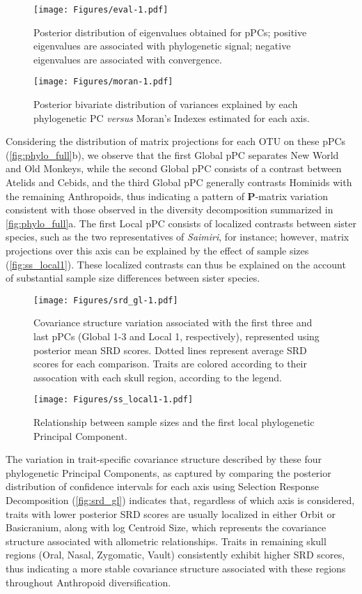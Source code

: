 \documentclass[12pt,twoside]{report}
\begin{document}
\begin{figure}[htbp]
\centering
\texttt{[image: Figures/eval-1.pdf]}
\caption{Posterior distribution of eigenvalues obtained for pPCs;
positive eigenvalues are associated with phylogenetic signal; negative
eigenvalues are associated with convergence. \label{fig:eval}}
\end{figure}

\begin{figure}[htbp]
\centering
\texttt{[image: Figures/moran-1.pdf]}
\caption{Posterior bivariate distribution of variances explained by each
phylogenetic PC \emph{versus} Moran's Indexes estimated for each axis.
\label{fig:moran}}
\end{figure}

Considering the distribution of matrix projections for each OTU on these
pPCs (\autoref{fig:phylo_full}b), we observe that the first Global pPC
separates New World and Old Monkeys, while the second Global pPC
consists of a contrast between Atelids and Cebids, and the third Global
pPC generally contrasts Hominids with the remaining Anthropoids, thus
indicating a pattern of $\mathbf{P}$-matrix variation consistent with
those observed in the diversity decomposition summarized in
\autoref{fig:phylo_full}a. The first Local pPC consists of localized
contrasts between sister species, such as the two representatives of
\emph{Saimiri}, for instance; however, matrix projections over this axis
can be explained by the effect of sample sizes
(\autoref{fig:ss_local1}). These localized contrasts can thus be
explained on the account of substantial sample size differences between
sister species.

\begin{figure}[htbp]
\centering
\texttt{[image: Figures/srd\_gl-1.pdf]}
\caption{Covariance structure variation associated with the first three
and last pPCs (Global 1-3 and Local 1, respectively), represented using
posterior mean SRD scores. Dotted lines represent average SRD scores for
each comparison. Traits are colored according to their assocation with
each skull region, according to the legend. \label{fig:srd_gl}}
\end{figure}

\begin{figure}[htbp]
\centering
\texttt{[image: Figures/ss\_local1-1.pdf]}
\caption{Relationship between sample sizes and the first local
phylogenetic Principal Component. \label{fig:ss_local1}}
\end{figure}

The variation in trait-specific covariance structure described by these
four phylogenetic Principal Components, as captured by comparing the
posterior distribution of confidence intervals for each axis using
Selection Response Decomposition (\autoref{fig:srd_gl}) indicates that,
regardless of which axis is considered, traits with lower posterior SRD
scores are usually localized in either Orbit or Basicranium, along with
log Centroid Size, which represents the covariance structure associated
with allometric relationships. Traits in remaining skull regions (Oral,
Nasal, Zygomatic, Vault) consistently exhibit higher SRD scores, thus
indicating a more stable covariance structure associated with these
regions throughout Anthropoid diversification.
\end{document}
